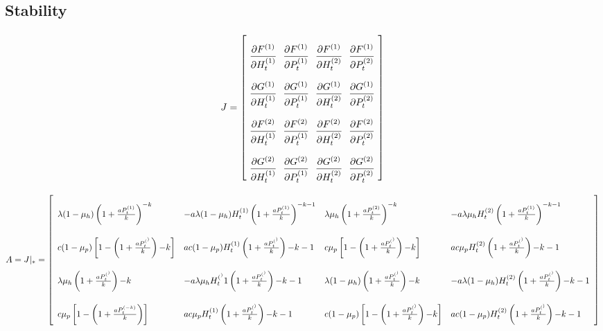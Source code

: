 \documentclass{article}
\begin{document}
\begin{landscape}
\subsection{Stability}
\begin{equation*}
\arraycolsep=3.2pt\def\arraystretch{3.2}
J = \left[ \begin{array}{llll}
     \dfrac{\partial F^{(1)}}{\partial H^{(1)}_t} & 
     \dfrac{\partial F^{(1)}}{\partial P^{(1)}_t} &
     \dfrac{\partial F^{(1)}}{\partial H^{(2)}_t} &
     \dfrac{\partial F^{(1)}}{\partial P^{(2)}_t}\\
     
     \dfrac{\partial G^{(1)}}{\partial H^{(1)}_t} & 
     \dfrac{\partial G^{(1)}}{\partial P^{(1)}_t} &
     \dfrac{\partial G^{(1)}}{\partial H^{(2)}_t} &
     \dfrac{\partial G^{(1)}}{\partial P^{(2)}_t}\\
     
     \dfrac{\partial F^{(2)}}{\partial H^{(1)}_t} & 
     \dfrac{\partial F^{(2)}}{\partial P^{(1)}_t} &
     \dfrac{\partial F^{(2)}}{\partial H^{(2)}_t} &
     \dfrac{\partial F^{(2)}}{\partial P^{(2)}_t}\\
     
     \dfrac{\partial G^{(2)}}{\partial H^{(1)}_t} & 
     \dfrac{\partial G^{(2)}}{\partial P^{(1)}_t} &
     \dfrac{\partial G^{(2)}}{\partial H^{(2)}_t} &
     \dfrac{\partial G^{(2)}}{\partial P^{(2)}_t}
 \end{array} \right]
 \end{equation*}

 \begin{equation*}
    A = J |_* = \left[ \begin{array}{llll}
    \lambda (1 - \mu_h) \apk{1}^{-k} &
    -a \lambda (1 - \mu_h) \Ht{1} \apk{1}^{-k-1} &
    \lambda \mu_h \apk{2}^{-k} &
    -a \lambda \mu_h \Ht{2} \apk{1}^{-k-1} \\
    
    c (1 - \mu_p) \left[1-\apk^{-k}\right] &
    a c (1 - \mu_p) \Ht{1} \apk^{-k-1} &
    c \mu_p \left[ 1 - \apk^{-k} \right] & 
    a c \mu_p \Ht{2} \apk^{-k-1}\\
    
    \lambda \mu_h \apk^{-k} &
    -a \lambda \mu_h \Ht^{1} \apk^{-k-1} &
    \lambda (1 - \mu_h) \apk^{-k} &
    -a \lambda (1-\mu_h) \Ht{2} \apk^{-k-1}\\
    
    c \mu_p \left[ 1 - \apk{-k} \right] &
    a c \mu_p \Ht{1} \apk^{-k-1} &
    c (1 - \mu_p) \left[ 1 - \apk^{-k} \right] &
    a c (1-\mu_p) \Ht{2} \apk^{-k-1}
  \end{array} \right]
\end{equation*}
\end{landscape}
\end{document}
